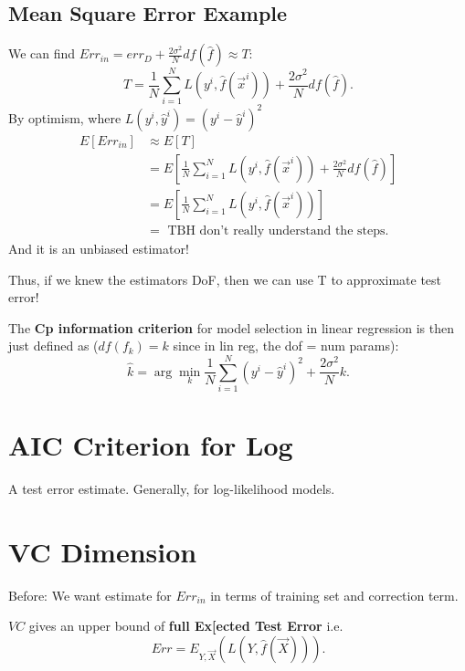 \documentclass[a4paper]{article}
\begin{document}
\subsection{Mean Square Error Example}
We can find $Err_{in}=err_D + \frac{2 \sigma^2}{N} df(\hat{f}) \approx T$:
\[
T=\frac{1}{N} \sum_{i=1}^N L(y^i, \hat{f}(\vec{x}^i)) +  \frac{2 \sigma^2}{N} df(\hat{f}) 
.\]
By optimism, where $L\left(y^i, \hat{y}^i \right) = (y^i - \hat{y}^i)^2$
\begin{align*}
  E[Err_{in}] & \approx E[T] \\
              &= E[\frac{1}{N} \sum_{i=1}^N L(y^i, \hat{f}(\vec{x}^i)) +  \frac{2 \sigma^2}{N} df(\hat{f})] \\
              &=  E[\frac{1}{N} \sum_{i=1}^N L(y^i, \hat{f}(\vec{x}^i))] \\
              &= \text{ TBH don't really understand the steps}
.\end{align*}
And it is an unbiased estimator!


Thus, if we knew the estimators DoF, then we can use T to approximate test error!

\begin{definition}
  The \textbf{Cp information criterion} for model selection in linear regression is then just defined as ($df(f_k) = k$ since in lin reg, the dof = num params):
  \[
    \hat{k} = \arg\min_{k} \frac{1}{N} \sum_{i=1}^N (y^i - \hat{y}^i)^2 + \frac{2 \sigma^2}{N} k
  .\] 
\end{definition}

\section{AIC Criterion for Log}
A test error estimate. Generally, for log-likelihood models.

\section{VC Dimension}
Before: We want estimate for $Err_{in}$ in terms of training set and correction term. 

\begin{remark}
  $VC$ gives an upper bound of \textbf{full Ex[ected Test Error} i.e.
\[
Err = E_{Y,\vec{X}} (L(Y, \hat{f}(\vec{X})))
.\] 
\end{remark}
\end{document}
